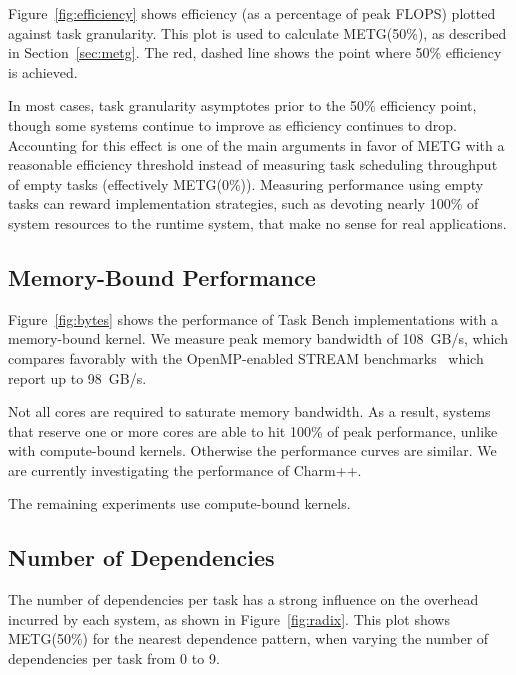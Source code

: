 Figure~\ref{fig:efficiency} shows efficiency (as a percentage of
peak FLOPS) plotted against task granularity. This plot is
used to calculate METG(50\%), as described in Section~\ref{sec:metg}. The
red, dashed line shows the point where 50\% efficiency is achieved.

In most cases, task granularity asymptotes prior to the 50\% efficiency point,
though some systems continue to improve as efficiency continues
to drop. Accounting for this effect is one of the main arguments in
favor of METG with a reasonable efficiency threshold instead of
measuring task scheduling throughput of empty tasks
(effectively METG(0\%)). Measuring performance using empty tasks can
reward implementation strategies, such as devoting nearly 100\% of
system resources to the runtime system, that make no sense for real
applications.

\subsection{Memory-Bound Performance}



Figure~\ref{fig:bytes} shows the performance of Task Bench
implementations with a memory-bound kernel. We measure peak memory
bandwidth of 108~GB/s, which compares favorably with the
OpenMP-enabled STREAM benchmarks~\cite{STREAM} which report up to 98~GB/s.

Not all cores are required to saturate memory bandwidth. As a result,
systems that reserve one or more cores are able to hit 100\% of peak
performance, unlike with compute-bound kernels. Otherwise the
performance curves are similar. We are currently investigating the
performance of Charm++.

The remaining experiments use compute-bound kernels.

\subsection{Number of Dependencies}
\label{subsec:number-of-dependencies}



The number of dependencies per task has a strong influence on the
overhead incurred by each system, as shown in
Figure~\ref{fig:radix}. This plot shows METG(50\%) for the nearest
dependence pattern, when varying the number of dependencies per task
from 0 to 9.


